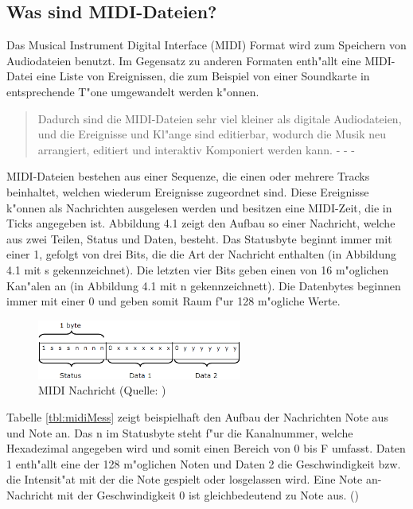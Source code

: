 {\subsection{Was sind MIDI-Dateien?}
Das Musical Instrument Digital Interface (MIDI) Format wird zum Speichern von Audiodateien benutzt. Im Gegensatz zu anderen Formaten enth"allt eine MIDI-Datei eine Liste von Ereignissen, die zum Beispiel von einer Soundkarte in entsprechende T"one umgewandelt werden k"onnen. 
\begin{quote}{\glqq}Dadurch sind die MIDI-Dateien sehr viel kleiner als digitale Audiodateien, und die Ereignisse und Kl"ange sind editierbar, wodurch die Musik neu arrangiert, editiert und interaktiv Komponiert werden kann.{\grqq} - - - \cite{ITwissen}\end{quote} 
MIDI-Dateien bestehen aus einer Sequenze, die einen oder mehrere Tracks beinhaltet, welchen wiederum Ereignisse zugeordnet sind. Diese Ereignisse k"onnen als Nachrichten ausgelesen werden und besitzen eine MIDI-Zeit, die in Ticks angegeben ist. Abbildung 4.1 zeigt den Aufbau so einer Nachricht, welche aus zwei Teilen, Status und Daten, besteht. Das Statusbyte beginnt immer mit einer 1, gefolgt von drei Bits, die die Art der Nachricht enthalten (in Abbildung 4.1 mit s gekennzeichnet). Die letzten vier Bits geben einen von 16 m"oglichen Kan"alen an (in Abbildung 4.1 mit n gekennzeichnett).
Die Datenbytes beginnen immer mit einer 0 und geben somit Raum f"ur 128  m"ogliche Werte.
\renewcommand{\figurename}{Abb.}
\begin{figure}[htp]
\centering
\includegraphics[width=0.60\textwidth]{pictures/MIDI-Message.png}
\caption[MIDI Nachricht]{MIDI Nachricht (Quelle: \cite{MIDIImg})}
\end{figure}

Tabelle \ref{tbl:midiMess} zeigt beispielhaft den Aufbau der Nachrichten {\glqq}Note aus{\grqq} und {\glqq}Note an{\grqq}. Das n im Statusbyte steht f"ur die Kanalnummer, welche Hexadezimal angegeben wird und somit einen Bereich von 0 bis F umfasst. Daten 1 enth"allt eine der 128 m"oglichen Noten und Daten 2 die Geschwindigkeit bzw. die Intensit"at mit der die Note gespielt oder losgelassen wird. Eine {\glqq}Note an{\grqq}-Nachricht mit der Geschwindigkeit 0 ist gleichbedeutend zu {\glqq}Note aus{\grqq}.
(\cite{MIDI})

}
